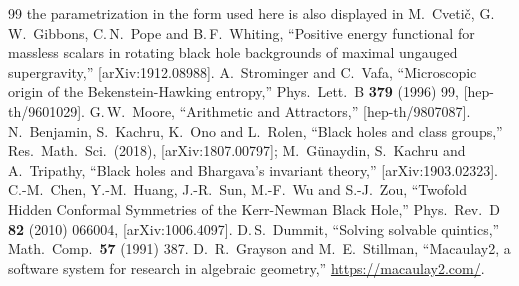 \documentclass[11pt]{article}
\theoremstyle{definition}
\theoremstyle{remark}
\begin{document}
\begin{thebibliography}{99}
the parametrization in the form used here is also displayed in
M.~Cveti\v{c}, G.\,W.~Gibbons, C.\,N.~Pope and B.\,F.~Whiting,
``Positive energy functional for massless scalars in rotating black hole
backgrounds of maximal ungauged supergravity,'' [arXiv:1912.08988].
 A.~Strominger and C.~Vafa,
``Microscopic origin of the Bekenstein-Hawking entropy,''
Phys.\ Lett.\ B {\bf 379} (1996) 99, [hep-th/9601029].
 G.\,W.~Moore, ``Arithmetic and Attractors,''
[hep-th/9807087].
 N.~Benjamin, S.~Kachru, K.~Ono and L.~Rolen,
``Black holes and class groups,'' Res.\ Math.\ Sci.\ (2018),
[arXiv:1807.00797]; M.~G\"unaydin, S.~Kachru and A.~Tripathy,
``Black holes and Bhargava's invariant theory,'' [arXiv:1903.02323].
 C.-M.~Chen, Y.-M.~Huang, J.-R.~Sun, M.-F.~Wu and S.-J.~Zou,
``Twofold Hidden Conformal Symmetries of the Kerr-Newman Black Hole,''
Phys.\ Rev.\ D {\bf 82} (2010) 066004, [arXiv:1006.4097].
 D.\,S.~Dummit, ``Solving solvable quintics,''
Math.\ Comp.\ {\bf 57} (1991) 387.
 D.~R.~Grayson and M.~E.~Stillman,
``Macaulay2, a software system for research in algebraic geometry,''
\url{https://macaulay2.com/}.
\end{thebibliography}
\end{document}
